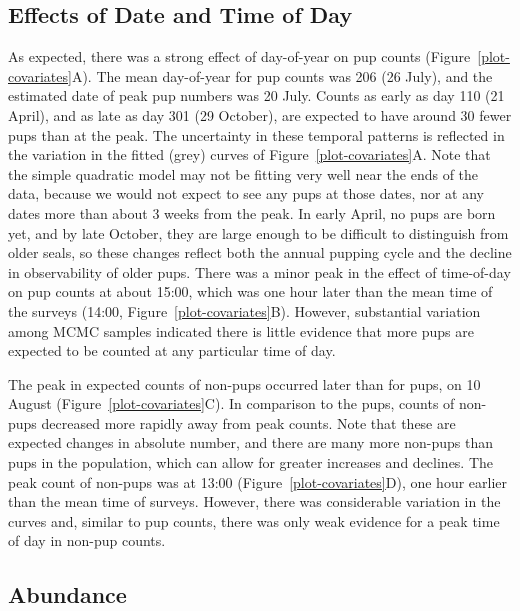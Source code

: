 \documentclass[12pt, titlepage]{article}\usepackage[]{graphicx}\usepackage[]{color}
\begin{document}
\subsection{Effects of Date and Time of Day}


As expected, there was a strong effect of day-of-year on pup counts (Figure~\ref{plot-covariates}A). The mean day-of-year for pup counts was 206 (26 July), and the estimated date of peak pup numbers was 20 July.  Counts as early as day 110 (21 April), and as late as day 301 (29 October), are expected to have around 30 fewer pups than at the peak.  The uncertainty in these temporal patterns is reflected in the variation in the fitted (grey) curves of Figure~\ref{plot-covariates}A. Note that the simple quadratic model may not be fitting very well near the ends of the data, because we would not expect to see any pups at those dates, nor at any dates more than about 3 weeks from the peak. In early April, no pups are born yet, and by late October, they are large enough to be difficult to distinguish from older seals, so these changes reflect both the annual pupping cycle and the decline in observability of older pups. There was a minor peak in the effect of time-of-day on pup counts at about 15:00, which was one hour later than the mean time of the surveys (14:00, Figure~\ref{plot-covariates}B). However, substantial variation among MCMC samples indicated there is little evidence that more pups are expected to be counted at any particular time of day. 

The peak in expected counts of non-pups occurred later than for pups, on 10 August (Figure~\ref{plot-covariates}C). In comparison to the pups, counts of non-pups decreased more rapidly away from peak counts.  Note that these are expected changes in absolute number, and there are many more non-pups than pups in the population, which can allow for greater increases and declines. The peak count of non-pups was at 13:00 (Figure~\ref{plot-covariates}D), one hour earlier than the mean time of surveys. However, there was considerable variation in the curves and, similar to pup counts, there was only weak evidence for a peak time of day in non-pup counts.


\subsection{Abundance} \label{sec:abundance}
\end{document}
